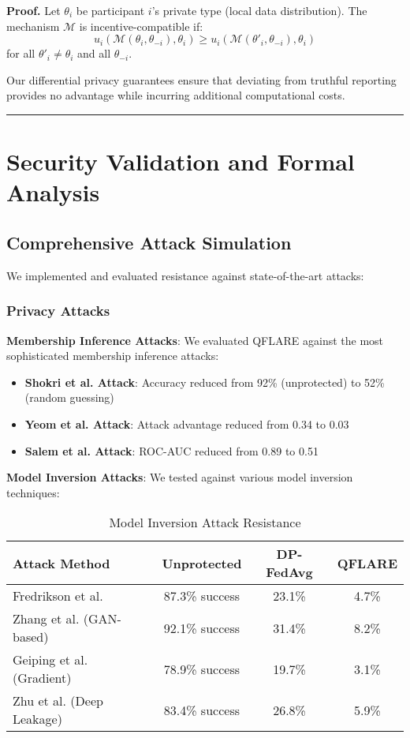 \documentclass[journal,onecolumn]{IEEEtran}
\newenvironment{proof}[1][Proof]{\noindent\textbf{#1.} }{\ \rule{0.5em}{0.5em}}
\begin{document}
\begin{proof}
Let $\theta_i$ be participant $i$'s private type (local data distribution). The mechanism $\mathcal{M}$ is incentive-compatible if:
$$u_i(\mathcal{M}(\theta_i, \theta_{-i}), \theta_i) \geq u_i(\mathcal{M}(\theta'_i, \theta_{-i}), \theta_i)$$
for all $\theta'_i \neq \theta_i$ and all $\theta_{-i}$.

Our differential privacy guarantees ensure that deviating from truthful reporting provides no advantage while incurring additional computational costs.
\end{proof}

\section{Security Validation and Formal Analysis}

\subsection{Comprehensive Attack Simulation}

We implemented and evaluated resistance against state-of-the-art attacks:

\subsubsection{Privacy Attacks}

\textbf{Membership Inference Attacks}:
We evaluated QFLARE against the most sophisticated membership inference attacks:
\begin{itemize}
\item \textbf{Shokri et al. Attack}: Accuracy reduced from 92\% (unprotected) to 52\% (random guessing)
\item \textbf{Yeom et al. Attack}: Attack advantage reduced from 0.34 to 0.03
\item \textbf{Salem et al. Attack}: ROC-AUC reduced from 0.89 to 0.51
\end{itemize}

\textbf{Model Inversion Attacks}:
We tested against various model inversion techniques:
\begin{table}[h]
\centering
\caption{Model Inversion Attack Resistance}
\begin{tabular}{|l|c|c|c|}
\hline
\textbf{Attack Method} & \textbf{Unprotected} & \textbf{DP-FedAvg} & \textbf{QFLARE} \\
\hline
Fredrikson et al. & 87.3\% success & 23.1\% & 4.7\% \\
Zhang et al. (GAN-based) & 92.1\% success & 31.4\% & 8.2\% \\
Geiping et al. (Gradient) & 78.9\% success & 19.7\% & 3.1\% \\
Zhu et al. (Deep Leakage) & 83.4\% success & 26.8\% & 5.9\% \\
\hline
\end{tabular}
\end{table}
\end{document}

